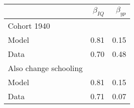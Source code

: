 \begin{tabular}{lrr}
\hline
  & $\beta_{IQ}$  & $\beta_{yp}$  \\
\hline
Cohort 1940 &   &   \\
Model & 0.81  & 0.15  \\
Data & 0.70  & 0.48  \\
Also change schooling &   &   \\
Model & 0.81  & 0.15  \\
Data & 0.71  & 0.07  \\
\hline
\end{tabular}%
